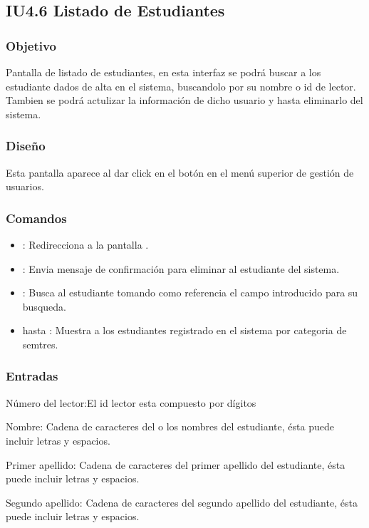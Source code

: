 \newpage
\subsection{IU4.6 Listado de Estudiantes}

\subsubsection{Objetivo}
	Pantalla de listado de estudiantes, en esta interfaz se podrá buscar a los estudiante  dados de alta en el sistema, buscandolo por su nombre o id de lector. Tambien se podrá actulizar la información de dicho usuario y hasta eliminarlo del sistema.

\subsubsection{Diseño}
	Esta pantalla aparece al dar click en el botón  en el menú superior de gestión de usuarios.  \\


\subsubsection{Comandos}
	\begin{itemize}
		\item {}: Redirecciona a la pantalla .
		\item {}: Envia mensaje de confirmación para eliminar al estudiante del sistema.  
		\item {}: Busca al estudiante tomando como referencia el campo introducido para su busqueda.  
		\item {} hasta : Muestra a los estudiantes registrado en el sistema por categoria de semtres.  
	\end{itemize}


\subsubsection{Entradas}
	\begin{Citemize}
		\item Número del lector:El id lector esta compuesto por dígitos
		\item Nombre: Cadena de caracteres del o los nombres del estudiante, ésta puede incluir letras y espacios. 
		\item Primer apellido: Cadena de caracteres del primer apellido del estudiante, ésta puede incluir letras y espacios. 
		\item Segundo apellido: Cadena de caracteres del segundo apellido del estudiante, ésta puede incluir letras y espacios. 
	\end{Citemize}

